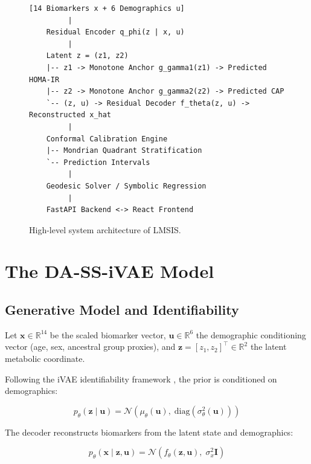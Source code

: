 \documentclass[12pt,a4paper,oneside]{report}
\begin{document}
\begin{figure}[H]
\centering
\begin{minipage}{0.85\textwidth}
\begin{lstlisting}
[14 Biomarkers x + 6 Demographics u]
         |
    Residual Encoder q_phi(z | x, u)
         |
    Latent z = (z1, z2)
    |-- z1 -> Monotone Anchor g_gamma1(z1) -> Predicted HOMA-IR
    |-- z2 -> Monotone Anchor g_gamma2(z2) -> Predicted CAP
    `-- (z, u) -> Residual Decoder f_theta(z, u) -> Reconstructed x_hat
         |
    Conformal Calibration Engine
    |-- Mondrian Quadrant Stratification
    `-- Prediction Intervals
         |
    Geodesic Solver / Symbolic Regression
         |
    FastAPI Backend <-> React Frontend
\end{lstlisting}
\end{minipage}
\caption{High-level system architecture of LMSIS.}
\label{fig:architecture}
\end{figure}

\section{The DA-SS-iVAE Model}

\subsection{Generative Model and Identifiability}

Let $\mathbf{x} \in \mathbb{R}^{14}$ be the scaled biomarker vector, $\mathbf{u} \in \mathbb{R}^{6}$ the demographic conditioning vector (age, sex, ancestral group proxies), and $\mathbf{z} = [z_1, z_2]^\top \in \mathbb{R}^2$ the latent metabolic coordinate.

Following the iVAE identifiability framework \citep{khemakhem2020}, the prior is conditioned on demographics:
\begin{equationbox}
\[
p_\theta(\mathbf{z} \mid \mathbf{u}) = \mathcal{N}\!\left(\mu_\theta(\mathbf{u}),\; \mathrm{diag}\!\left(\sigma^2_\theta(\mathbf{u})\right)\right)
\]\vspace{-6pt}
\end{equationbox}

The decoder reconstructs biomarkers from the latent state and demographics:
\begin{equationbox}
\[
p_\theta(\mathbf{x} \mid \mathbf{z}, \mathbf{u}) = \mathcal{N}\!\left(f_\theta(\mathbf{z}, \mathbf{u}),\; \sigma^2_x \mathbf{I}\right)
\]\vspace{-6pt}
\end{equationbox}
\end{document}
